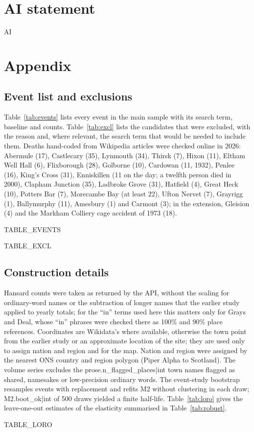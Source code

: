 \documentclass[11pt,a4paper]{article}
\begin{document}
\section*{AI statement}
{{AI}}




\appendix
\section{Appendix}
\label{sec:appendix}
\subsection{Event list and exclusions}
Table~\ref{tab:events} lists every event in the main sample with its search term, baseline and counts. Table~\ref{tab:excl} lists the candidates that were excluded, with the reason and, where relevant, the search term that would be needed to include them. Deaths hand-coded from Wikipedia articles were checked online in 2026: Abermule (17), Castlecary (35), Lynmouth (34), Thirsk (7), Hixon (11), Eltham Well Hall (6), Flixborough (28), Golborne (10), Cardowan (11, 1932), Penlee (16), King's Cross (31), Enniskillen (11 on the day; a twelfth person died in 2000), Clapham Junction (35), Ladbroke Grove (31), Hatfield (4), Great Heck (10), Potters Bar (7), Morecambe Bay (at least 22), Ufton Nervet (7), Grayrigg (1), Ballymurphy (11), Amesbury (1) and Carmont (3); in the extension, Gleision (4) and the Markham Colliery cage accident of 1973 (18).

{{TABLE_EVENTS}}

{{TABLE_EXCL}}

\subsection{Construction details}
Hansard counts were taken as returned by the API, without the scaling for ordinary-word names or the subtraction of longer names that the earlier study applied to yearly totals; for the ``in'' terms used here this matters only for Grays and Deal, whose ``in'' phrases were checked there as 100\% and 90\% place references. Coordinates are Wikidata's where available, otherwise the town point from the earlier study or an approximate location of the site; they are used only to assign nation and region and for the map. Nation and region were assigned by the nearest ONS country and region polygon (Piper Alpha to Scotland). The volume series excludes the {{prose.n_flagged_places|int}} town names flagged as shared, namesakes or low-precision ordinary words. The event-study bootstrap resamples events with replacement and refits M2 without clustering in each draw; {{M2.boot_ok|int}} of 500 draws yielded a finite half-life. Table~\ref{tab:loro} gives the leave-one-out estimates of the elasticity summarised in Table~\ref{tab:robust}.

{{TABLE_LORO}}
\end{document}
